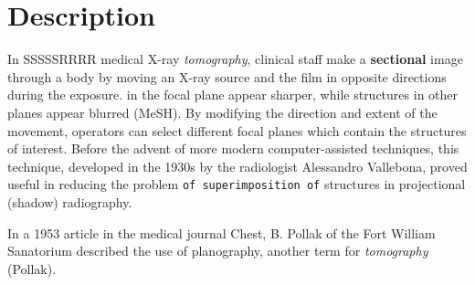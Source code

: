 \documentclass[a4paper,twoside,onecolumn]{report}
\begin{document}
\section{Description}
	In  \large{SSSSSRRRR} medical X-ray \emph{tomography}, clinical staff make a \textbf{sectional}
	image through a body by moving an X-ray source and the film in opposite
	directions during the exposure.  in the focal plane
	appear sharper, while structures in other planes appear blurred (MeSH).
	By modifying the direction and extent of the movement, operators can select
	different focal planes which contain the structures of interest. Before the
	advent of more modern computer-assisted techniques, this technique,
	developed in the 1930s by the radiologist Alessandro Vallebona, proved
	useful in reducing the problem \texttt{of superimposition of} structures in
	projectional (shadow) radiography.

	In a 1953 article in the medical journal Chest, B. Pollak of the Fort
	William Sanatorium described the use of planography, another term for
	\emph{tomography} (Pollak).
\end{document}
